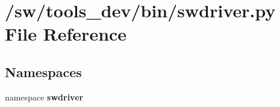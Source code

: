 \section{/sw/tools\_\-dev/bin/swdriver.py File Reference}
\label{swdriver_8py}
\subsection*{Namespaces}
\begin{CompactItemize}
\item 
namespace {\bf swdriver}
\end{CompactItemize}
